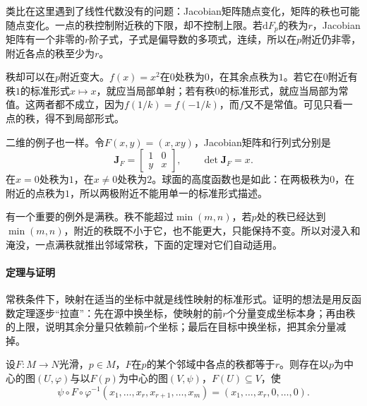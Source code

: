 类比在这里遇到了线性代数没有的问题：Jacobian矩阵随点变化，矩阵的秩也可能随点变化。一点的秩控制附近秩的下限，却不控制上限。若$\mathrm dF_p$的秩为$r$，Jacobian矩阵有一个非零的$r$阶子式，子式是偏导数的多项式，连续，所以在$p$附近仍非零，附近各点的秩至少为$r$。

秩却可以在$p$附近变大。$f(x)=x^2$在$0$处秩为$0$，在其余点秩为$1$。若它在$0$附近有秩$1$的标准形式$x\mapsto x$，就应当局部单射；若有秩$0$的标准形式，就应当局部为常值。这两者都不成立，因为$f(1/k)=f(-1/k)$，而$f$又不是常值。可见只看一点的秩，得不到局部形式。

二维的例子也一样。令$F(x,y)=(x,xy)$，Jacobian矩阵和行列式分别是
\[
\bm J_F=\begin{bmatrix}1&0\\y&x\end{bmatrix},\qquad \det\bm J_F=x.
\]
在$x=0$处秩为$1$，在$x\neq0$处秩为$2$。球面的高度函数也是如此：在两极秩为$0$，在附近的点秩为$1$，所以两极附近不能用单一的标准形式描述。

有一个重要的例外是满秩。秩不能超过$\min(m,n)$，若$p$处的秩已经达到$\min(m,n)$，附近的秩既不小于它，也不能更大，只能保持不变。所以对浸入和淹没，一点满秩就推出邻域常秩，下面的定理对它们自动适用。

\paragraph{定理与证明}
常秩条件下，映射在适当的坐标中就是线性映射的标准形式。证明的想法是用反函数定理逐步“拉直”：先在源中换坐标，使映射的前$r$个分量变成坐标本身；再由秩的上限，说明其余分量只依赖前$r$个坐标；最后在目标中换坐标，把其余分量减掉。

\begin{theorem}[常秩定理]
\label{thm:mrel-constant-rank}
设$F:M\to N$光滑，$p\in M$，$F$在$p$的某个邻域中各点的秩都等于$r$。则存在以$p$为中心的图$(U,\varphi)$与以$F(p)$为中心的图$(V,\psi)$，$F(U)\subseteq V$，使
\begin{equation}
\psi\circ F\circ\varphi^{-1}(x_1,\ldots,x_r,x_{r+1},\ldots,x_m)=(x_1,\ldots,x_r,0,\ldots,0).
\label{eq:mrel-constant-rank-form}
\end{equation}
\end{theorem}

